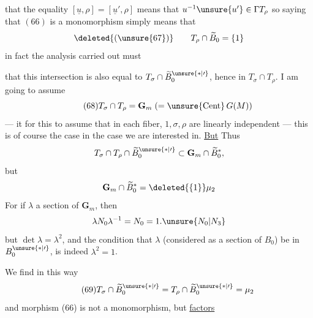  that the equality $[\underline u,\rho]=[\underline u',\rho]$ means that $u^{-1}\unsure{u'}\in\Gamma T_\rho$ so  saying that $(66)$ is a monomorphism simply means that
\[
\deleted{(\unsure{67})}\qquad T_\rho\cap\widetilde B_0=\{1\}
\]
in fact the analysis carried out must 


that this intersection is also equal to $T_\sigma\cap\widetilde B_0^{\unsure{*|\prime}}$, hence  in $T_\sigma\cap T_\rho$. I am going to assume
\[
\tag{68}
T_\sigma\cap T_\rho=\mathbf G_m\;(=\unsure{\mathrm{Cent}}\,G(M))
\]
--- it  for this to assume that in each fiber, $1,\sigma,\rho$ are linearly independent --- this is of course the case in the case we are interested in. \uline{But} Thus
\[
T_\sigma\cap T_\rho\cap\widetilde B_0^{\unsure{*|\prime}}\subset\mathbf G_m\cap\widetilde B_0^*,
\]
but
\[
\mathbf G_m\cap\widetilde B_0^*=\deleted{\{1\}}\mu_2
\]
For if $\lambda$   a  section of $\mathbf G_m$, then
\[
\lambda N_0\lambda^{-1}=N_0=1.\unsure{N_0|N_3}
\]
but $\det\lambda=\lambda^2$, and the condition that $\lambda$  (considered as a section of $B_0$) be in $B_0^{\unsure{*|\prime}}$, is indeed \uline{$\lambda^2=1$}. 

We find  in this way
\[
\tag{69}
T_\sigma\cap\widetilde B_0^{\unsure{*|\prime}}=T_\rho\cap\widetilde B_0^{\unsure{*|\prime}}=\mu_2
\]
and  morphism (66) is not a monomorphism, but \uline{factors}


